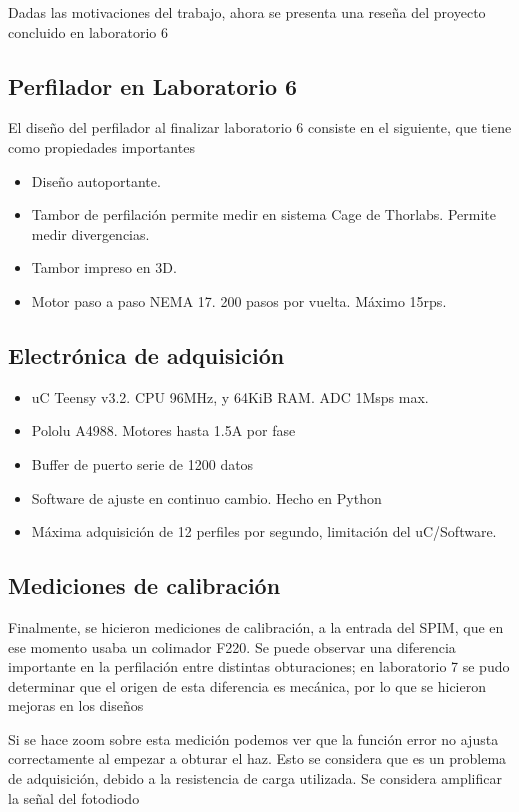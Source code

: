  Dadas las motivaciones del trabajo, ahora se presenta una reseña del proyecto concluido en laboratorio 6
 
\subsection{Perfilador en Laboratorio 6}

El diseño del perfilador al finalizar laboratorio 6 consiste en el siguiente, que tiene como propiedades importantes
\begin{itemize}
    \item Diseño autoportante.
    \item Tambor de perfilación permite medir en sistema Cage de Thorlabs. Permite medir divergencias.
    \item Tambor impreso en 3D.
    \item Motor paso a paso NEMA 17. 200 pasos por vuelta. Máximo 15rps. 
\end{itemize}
            

\subsection{Electrónica de adquisición}

\begin{itemize}
    \item uC Teensy v3.2. CPU 96MHz, y 64KiB RAM. ADC 1Msps max.
    \item Pololu A4988. Motores hasta 1.5A por fase
    \item Buffer de puerto serie de 1200 datos
    \item Software de ajuste en continuo cambio. Hecho en Python
    \item Máxima adquisición de 12 perfiles por segundo, limitación del uC/Software.
\end{itemize}
        

\subsection{Mediciones de calibración}
        Finalmente, se hicieron mediciones de calibración, a la entrada del SPIM, que en ese momento usaba un colimador F220. Se puede observar una diferencia importante en la perfilación entre distintas obturaciones; en laboratorio 7 se pudo determinar que el origen de esta diferencia es mecánica, por lo que se hicieron mejoras en los diseños
         
        Si se hace zoom sobre esta medición podemos ver que la función error no ajusta correctamente al empezar a obturar el haz. Esto se considera que es un problema de adquisición, debido a la resistencia de carga utilizada. Se considera amplificar la señal del fotodiodo
           
